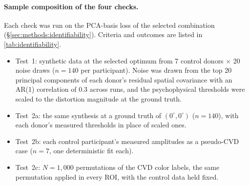 \paragraph{Sample composition of the four checks.}
Each check was run on the PCA-basis loss of the selected combination (\S\ref{sec:methods:identifiability}). Criteria and outcomes are listed in \cref{tab:identifiability}.
\begin{itemize}
  \item Test~1: synthetic data at the selected optimum from 7 control donors $\times$ 20 noise draws ($n = 140$ per participant). Noise was drawn from the top 20 principal components of each donor's residual spatial covariance with an AR(1) correlation of $0.3$ across runs, and the psychophysical thresholds were scaled to the distortion magnitude at the ground truth.
  \item Test~2a: the same synthesis at a ground truth of $(0^\circ, 0^\circ)$ ($n = 140$), with each donor's measured thresholds in place of scaled ones.
  \item Test~2b: each control participant's measured amplitudes as a pseudo-CVD case ($n = 7$, one deterministic fit each).
  \item Test~2c: $N = 1{,}000$ permutations of the CVD color labels, the same permutation applied in every ROI, with the control data held fixed.
\end{itemize}

